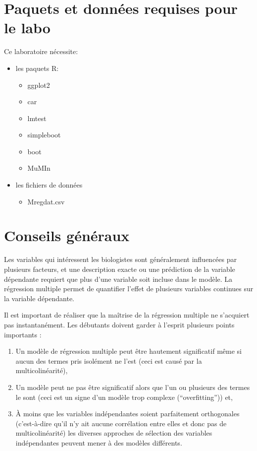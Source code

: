 \documentclass[12pt,]{book}
\providecommand{\tightlist}{%
  \setlength{\itemsep}{0pt}\setlength{\parskip}{0pt}}
\begin{document}
\hypertarget{set-reg-mul}{%
\section{Paquets et données requises pour le labo}\label{set-reg-mul}}

Ce laboratoire nécessite:

\begin{itemize}
\tightlist
\item
  les paquets R:

  \begin{itemize}
  \tightlist
  \item
    ggplot2
  \item
    car
  \item
    lmtest
  \item
    simpleboot
  \item
    boot
  \item
    MuMIn
  \end{itemize}
\item
  les fichiers de données

  \begin{itemize}
  \tightlist
  \item
    Mregdat.csv
  \end{itemize}
\end{itemize}

\hypertarget{conseils-guxe9nuxe9raux}{%
\section{Conseils généraux}\label{conseils-guxe9nuxe9raux}}

Les variables qui intéressent les biologistes sont généralement influencées par plusieurs facteurs, et une description exacte ou une prédiction de la variable dépendante requiert que plus d'une variable soit incluse dans le modèle. La régression multiple permet de quantifier l'effet de plusieurs variables continues sur la variable dépendante.

Il est important de réaliser que la maîtrise de la régression multiple ne s'acquiert pas instantanément. Les débutants doivent garder à l'esprit plusieurs points importants :

\begin{enumerate}
\def\labelenumi{\arabic{enumi}.}
\tightlist
\item
  Un modèle de régression multiple peut être hautement significatif même si aucun des termes pris isolément ne l'est (ceci est causé par la multicolinéarité),
\item
  Un modèle peut ne pas être significatif alors que l'un ou plusieurs des termes le sont (ceci est un signe d'un modèle trop complexe (``overfitting'')) et,
\item
  À moins que les variables indépendantes soient parfaitement orthogonales (c'est-à-dire qu'il n'y ait aucune corrélation entre elles et donc pas de multicolinéarité) les diverses approches de sélection des variables indépendantes peuvent mener à des modèles différents.
\end{enumerate}
\end{document}
